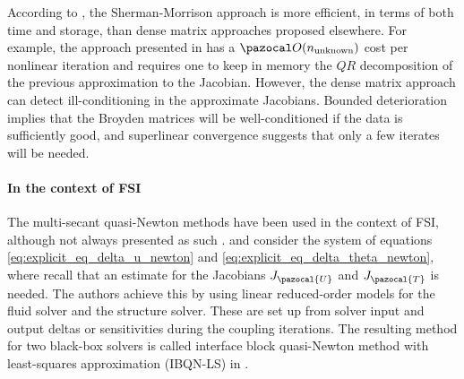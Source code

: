 According to \cite{kelley_solving_2003}, the Sherman-Morrison approach is more efficient, in terms of both time and storage, than dense matrix approaches proposed elsewhere.
For example, the approach presented in \cite{dennis_numerical_1996} has a \(\pazocal O(n_\text{unknown})\) cost per nonlinear iteration and requires one to keep in memory the \(QR\) decomposition of the previous approximation to the Jacobian.
However, the dense matrix approach can detect ill-conditioning in the approximate Jacobians.
Bounded deterioration implies that the Broyden matrices will be well-conditioned if the data is sufficiently good, and superlinear convergence suggests that only a few iterates will be needed.


\paragraph{In the context of FSI}

The multi-secant quasi-Newton methods have been used in the context of FSI, although not always presented as such \citep{haelterman_quasi-newton_2009, gatzhammer_efficient_2014, uekermann_partitioned_2016, scheufele_coupling_2018}.
 \cite{vierendeels_implicit_2007} and \cite{degroote_stability_2008} consider the system of equations \eqref{eq:explicit_eq_delta_u_newton} and \eqref{eq:explicit_eq_delta_theta_newton}, where recall that an estimate for the Jacobians \(J_\pazocal{U}\) and \(J_\pazocal{T}\) is needed.
The authors achieve this by using linear reduced-order models for the fluid solver and the structure solver.
These are set up from solver input and output deltas or sensitivities during the coupling iterations.
The resulting method for two black-box solvers is called interface block quasi-Newton method with least-squares approximation (IBQN-LS) in \cite{degroote_development_2010}.

